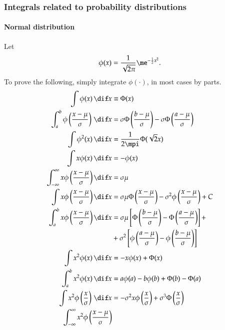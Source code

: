 \documentclass[a4paper]{article}
\numberwithin{equation}{subsection}
\begin{document}
\subsubsection{Integrals related to probability distributions}

\paragraph{Normal distribution}
Let
\begin{equation}
  \phi(x)
  =
  \frac{1}{\sqrt{2\pi}}
  \me^{-\frac{1}{2} x^{2}}.
\end{equation}
To prove the following, simply integrate $\phi(\cdot)$, in most cases
by parts.
\begin{align}
  \int \phi(x) \,\dif x
  &\equiv
  \Phi(x)
  \\
  \int_{a}^{b} \phi\left(\frac{x - \mu}{\sigma} \right) \,\dif x
  &=
  \sigma \Phi \left(\frac{b - \mu}{\sigma} \right) -
  \sigma \Phi \left(\frac{a - \mu}{\sigma} \right)
  \\
  \int \phi^2(x) \,\dif x
  &=
  \frac{1}{2\mpi} \Phi(\sqrt{2} x)
  \\
  \int x \phi(x) \,\dif x
  &=
  -\phi(x)
  \\
  \int_{-\infty}^\infty x \phi \left( \frac{x-\mu}{\sigma} \right) 
  \dif x 
  &=
  \sigma \mu \\
  \int  x \phi \left( \frac{x-\mu}{\sigma} \right) \dif x 
  &=
  \sigma \mu
  \Phi \left( \frac{x-\mu}{\sigma} \right) 
  -
  \sigma^2
  \phi \left( \frac{x-\mu}{\sigma} \right) 
  + C
  \\
  \int_a^b  x \phi \left( \frac{x-\mu}{\sigma} \right) \dif x 
  &=
  \sigma \mu \left[
    \Phi \left( \frac{b-\mu}{\sigma} \right) -
    \Phi \left( \frac{a-\mu}{\sigma} \right) \right] + \notag\\
  &+
  \sigma^2 \left[
    \phi \left( \frac{a-\mu}{\sigma} \right) -
    \phi \left( \frac{b-\mu}{\sigma} \right) \right]\\
  \int x^2 \phi (x) \, \dif x 
  &= 
  -x \phi (x) + \Phi(x)\\
  \int_a^b x^2 \phi(x) \,\dif x
  &=
  a\phi(a) - b\phi(b) + \Phi(b) - \Phi(a)\\
  \int x^2 \phi \left( \frac{x}{\sigma} \right) \, \dif x 
  &= 
  -\sigma^2 x \phi \left( \frac{x}{\sigma} \right) +
  \sigma^3 \Phi \left( \frac{x}{\sigma} \right)\\
  \int_{-\infty}^\infty x^2 \phi \left( \frac{x-\mu}{\sigma} \right)

\end{align}
\end{document}
